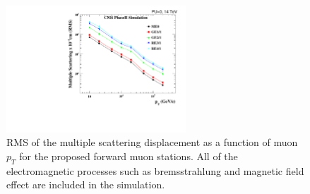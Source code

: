 \begin{figure}[H]
	\centering
	\includegraphics[width=0.6\textwidth]{fig/chapt2/MS_allstations.pdf}
	\caption{\label{fig:MultiScat}  RMS of the multiple scattering displacement as a function of muon $p_T$ for the  proposed forward muon stations. All of the electromagnetic processes such as bremsstrahlung and magnetic field effect are included in the simulation.}
\end{figure}

\clearpage{\pagestyle{empty}\cleardoublepage}
